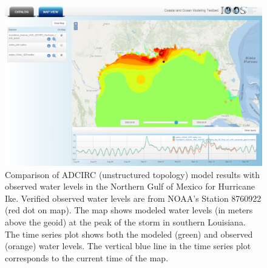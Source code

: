 \begin{figure}[ht!]
  \centering
  \includegraphics[width=\columnwidth]{../figs/SciWMS_ModelObsComparison}
  \caption{Comparison of ADCIRC (unstructured topology) model results
    with observed water levels in the Northern Gulf of Mexico for
    Hurricane Ike. Verified observed water levels are from NOAA's
    Station 8760922 (red dot on map). The map shows modeled water
    levels (in meters above the geoid) at the peak of the storm in
    southern Louisiana. The time series plot shows both the modeled
    (green) and observed (orange) water levels. The vertical blue line
    in the time series plot corresponds to the current time of the
    map.}
  \label{fig:adcirc_comp}
\end{figure}

